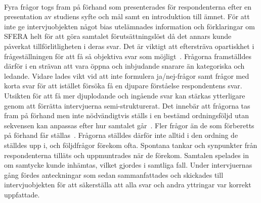 \paragraph{}
\hspace{-11pt}Fyra frågor togs fram på förhand som presenterades för respondenterna efter en presentation av studiens syfte och mål samt en introduktion till ämnet.
För att inte ge intervjuobjekten något bias utelämnades information och förklaringar om SFERA helt för att göra samtalet förutsättningslöst då det annars kunde påverkat tillförlitligheten i deras svar.
Det är viktigt att eftersträva opartiskhet i frågeställningen för att få så objektiva svar som möjligt~\cite{Oates2005}.
Frågorna framställdes därför i en strävan att vara öppna och inbjudande snarare än kategoriska och ledande.
Vidare lades vikt vid att inte formulera ja/nej-frågor samt frågor med korta svar för att istället försöka få en djupare förståelse respondentens svar.
Utsikten för att få mer djuplodande och ingående svar kan stärkas ytterligare genom att förrätta intervjuerna semi-strukturerat.
Det innebär att frågorna tas fram på förhand men inte nödvändigtvis ställs i en bestämd ordningsföljd utan sekvensen kan anpassas efter hur samtalet går~\cite{Oates2005}.
Fler frågor än de som förberetts på förhand får ställas~\cite{Oates2005}.
Frågorna ställdes därför inte alltid i den ordning de ställdes upp i, och följdfrågor förekom ofta.
Spontana tankar och synpunkter från respondenterna tilläts och uppmuntrades när de förekom.
Samtalen spelades in om samtycke kunde inhämtas, vilket gjordes i samtliga fall.
Under intervjuernas gång fördes anteckningar som sedan sammanfattades och skickades till intervjuobjekten för att säkerställa att alla svar och andra yttringar var korrekt uppfattade.
